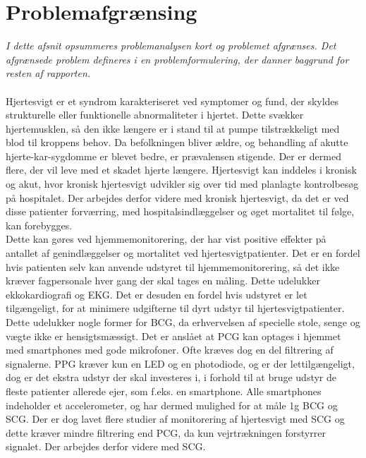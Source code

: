 \section{Problemafgrænsing}
\textit{I dette afsnit opsummeres problemanalysen kort og problemet afgrænses. Det afgrænsede problem defineres i en problemformulering, der danner baggrund for resten af rapporten.}\\
\\
Hjertesvigt er et syndrom karakteriseret ved symptomer og fund, der skyldes strukturelle eller funktionelle abnormaliteter i hjertet. Dette svækker hjertemusklen, så den ikke længere er i stand til at pumpe tilstrækkeligt med blod til kroppens behov.
Da befolkningen bliver ældre, og behandling af akutte hjerte-kar-sygdomme er blevet bedre, er prævalensen stigende. Der er dermed flere, der vil leve med et skadet hjerte længere. %
Hjertesvigt kan inddeles i kronisk og akut, hvor kronisk hjertesvigt udvikler sig over tid med planlagte kontrolbesøg på hospitalet. Der arbejdes derfor videre med kronisk hjertesvigt, da det er ved disse patienter forværring, med hospitalsindlæggelser og øget mortalitet til følge, kan forebygges.\\
Dette kan gøres ved hjemmemonitorering, der har vist positive effekter på antallet af genindlæggelser og mortalitet ved hjertesvigtpatienter. Det er en fordel hvis patienten selv kan anvende udstyret til hjemmemonitorering, så det ikke kræver fagpersonale hver gang der skal tages en måling. Dette udelukker ekkokardiografi og EKG. Det er desuden en fordel hvis udstyret er let tilgængeligt, for at minimere udgifterne til dyrt udstyr til hjertesvigtpatienter. Dette udelukker nogle former for BCG, da erhvervelsen af specielle stole, senge og vægte ikke er hensigtsmæssigt. Det er anslået at PCG kan optages i hjemmet med smartphones med gode mikrofoner. Ofte kræves dog en del filtrering af signalerne. PPG kræver kun en LED og en photodiode, og er der lettilgængeligt, dog er det ekstra udstyr der skal investeres i, i forhold til at bruge udstyr de fleste patienter allerede ejer, som f.eks. en smartphone. Alle smartphones indeholder et accelerometer, og har dermed mulighed for at måle 1g BCG og SCG. Der er dog lavet flere studier af monitorering af hjertesvigt med SCG og dette kræver mindre filtrering end PCG, da kun vejrtrækningen forstyrrer signalet. Der arbejdes derfor videre med SCG.

